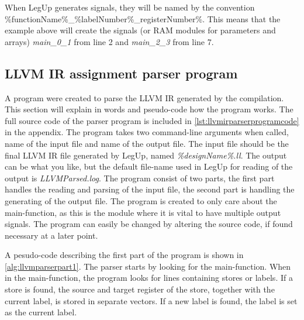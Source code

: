 When LegUp generates signals, they will be named by the convention \%functionName\%\_\%labelNumber\%\_registerNumber\%. This means that the example above will create the signals (or RAM modules for parameters and arrays) \textit{main\_0\_1} from line 2 and \textit{main\_2\_3} from line 7.
\subsection{LLVM IR assignment parser program}
A program were created to parse the LLVM IR generated by the compilation. This section will explain in words and pseudo-code how the program works. The full source code of the parser program is included in \ref{lst:llvmirparserprogramcode} in the appendix. The program takes two command-line arguments when called, name of the input file and name of the output file. The input file should be the final LLVM IR file generated by LegUp, named \textit{\%designName\%.ll}. The output can be what you like, but the default file-name used in LegUp for reading of the output is \textit{LLVMParsed.log}. The program consist of two parts, the first part handles the reading and parsing of the input file, the second part is handling the generating of the output file. The program is created to only care about the main-function, as this is the module where it is vital to have multiple output signals. The program can easily be changed by altering the source code, if found necessary at a later point.

A pesudo-code describing the first part of the program is shown in \cref{alg:llvmparserpart1}. The parser starts by looking for the main-function. When in the main-function, the program looks for lines containing stores or labels. If a store is found, the source and target register of the store, together with the current label, is stored in separate vectors. If a new label is found, the label is set as the current label.

